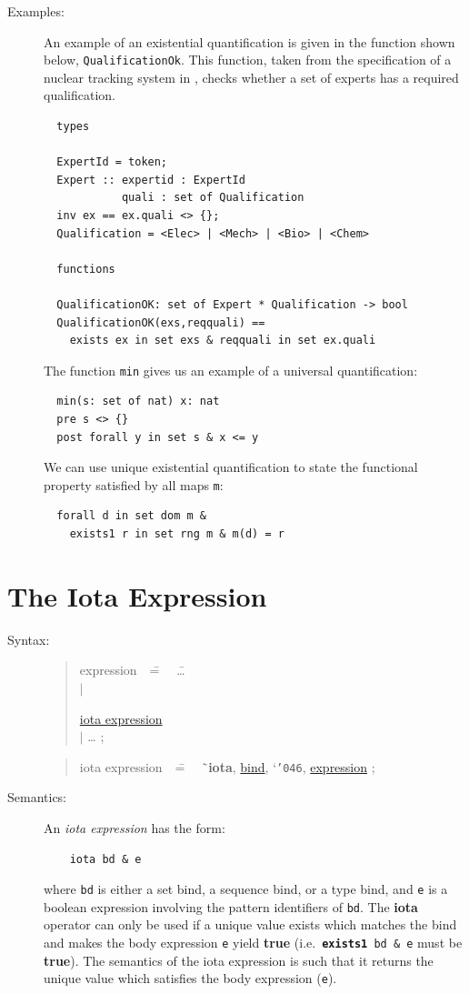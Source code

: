 \documentclass{overturerepchap}
\newcommand{\Lit}[1]{`{\tt #1}\Quote}
\newcommand{\Rule}[2]{
  \begin{quote}\begin{tabbing}
    #1\index{#1}\ \ \= = \ \ \= #2  ; %

  \end{tabbing}\end{quote}
  }
\newcommand{\Ruleref}[1]{
  \hyperlink{rule:#1}{#1}}
\newcommand{\dsep}{\\ \> $|$ \>}
\newcommand{\Lop}[1]{`{\bf\ttfamily #1}\Quote}
\newcommand{\keyw}[1]{{\bf\ttfamily #1}}
\begin{document}
{\begin{description}
\item[Examples:]
  An example of an existential quantification is given in the function
  shown below, \texttt{QualificationOk}. This function, taken from the
  specification of a nuclear tracking system in \cite{Fitzgerald&98},
  checks whether a set of experts has a required qualification.
  \begin{lstlisting}
  types

  ExpertId = token;
  Expert :: expertid : ExpertId
            quali : set of Qualification
  inv ex == ex.quali <> {};
  Qualification = <Elec> | <Mech> | <Bio> | <Chem>

  functions

  QualificationOK: set of Expert * Qualification -> bool
  QualificationOK(exs,reqquali) ==
    exists ex in set exs & reqquali in set ex.quali
  \end{lstlisting}
  The function \texttt{min} gives us an example of a universal
  quantification:
  \begin{lstlisting}
  min(s: set of nat) x: nat
  pre s <> {}
  post forall y in set s & x <= y
  \end{lstlisting}
  We can use unique existential quantification to state the functional
  property satisfied by all maps \texttt{m}:
  \begin{lstlisting}
  forall d in set dom m &
    exists1 r in set rng m & m(d) = r
  \end{lstlisting}


\end{description}

\section{The Iota Expression}\label{iotaexpr}

\begin{description}
\item[Syntax:]
  \Rule{expression}{
    \ldots \dsep
    \Ruleref{iota expression} \dsep
    \ldots
    }

  \Rule{iota expression}{
    \Lop{iota}, \Ruleref{bind}, \Lit{\char'046}, \Ruleref{expression}
    }

\item[Semantics:] An {\it iota expression} has the form:
  \begin{lstlisting}
    iota bd & e
  \end{lstlisting}
  where {\tt bd} is either a set bind, a sequence bind, or a type bind, and {\tt e} is a
  boolean expression involving the pattern identifiers of {\tt bd}.
  The \keyw{iota} operator can only be used if a unique value exists
  which matches the bind and makes the body expression {\tt e} yield
  \keyw{true} (i.e.\ {\tt \keyw{exists1} bd \& e} must be \keyw{true}). The
  semantics of the iota expression is such that it returns the unique
  value which satisfies the body expression ({\tt e}).


\end{description}}
\end{document}
